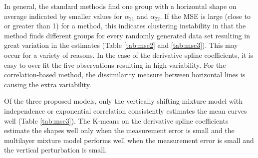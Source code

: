 In general, the standard methods find one group with a horizontal shape on average indicated by smaller values for $\alpha_{21}$ and $\alpha_{22}$. If the MSE is large (close to or greater than 1) for a method, this indicates clustering instability in that the method finds different groups for every randomly generated data set resulting in great variation in the estimates (Table \ref{tab:mse2} and \ref{tab:mse3}). This may occur for a variety of reasons. In the case of the derivative spline coefficients, it is easy to over fit the five observations resulting in high variability. For the correlation-based method, the dissimilarity measure between horizontal lines is causing the extra variability.
  
 Of the three proposed models, only the vertically shifting mixture model with independence or exponential correlation consistently estimates the mean curves well (Table \ref{tab:mse3}). The K-means on the derivative spline coefficients estimate the shapes well only when the measurement error is small and the multilayer mixture model performs well when the measurement error is small and the vertical perturbation is small. 


